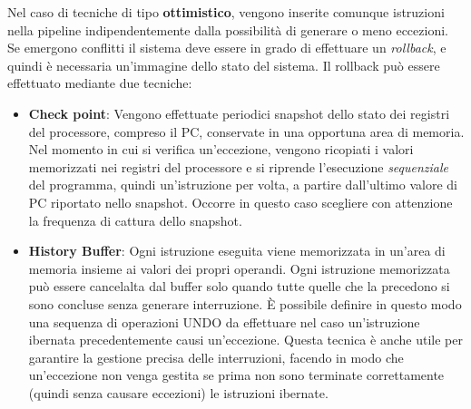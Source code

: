 \noindent Nel caso di tecniche di tipo \textbf{ottimistico}, vengono inserite comunque istruzioni nella pipeline indipendentemente dalla possibilità di generare o meno eccezioni. Se emergono conflitti il sistema deve essere in grado di effettuare un \textit{rollback}, e quindi è necessaria un'immagine dello stato del sistema.  
Il rollback può essere effettuato mediante due tecniche:

\begin{itemize}
    \item \textbf{Check point}: Vengono effettuate periodici snapshot dello stato dei registri del processore, compreso il PC, conservate in una opportuna area di memoria. Nel momento in cui si verifica un'eccezione, vengono ricopiati i valori memorizzati nei registri del processore e si riprende l'esecuzione \textit{sequenziale} del programma, quindi un'istruzione per volta, a partire dall'ultimo valore di PC riportato nello snapshot. Occorre in questo caso scegliere con attenzione la frequenza di cattura dello snapshot. 
    \item \textbf{History Buffer}: Ogni istruzione eseguita viene memorizzata in un'area di memoria insieme ai valori dei propri operandi. Ogni istruzione memorizzata può essere cancelalta dal buffer solo quando tutte quelle che la precedono si sono concluse senza generare interruzione. \uppercase{è} possibile definire in questo modo una sequenza di operazioni UNDO da effettuare nel caso un'istruzione ibernata precedentemente causi un'eccezione. Questa tecnica è anche utile per garantire la gestione precisa delle interruzioni, facendo in modo che un'eccezione non venga gestita se prima non sono terminate correttamente (quindi senza causare eccezioni) le istruzioni ibernate.
\end{itemize}

